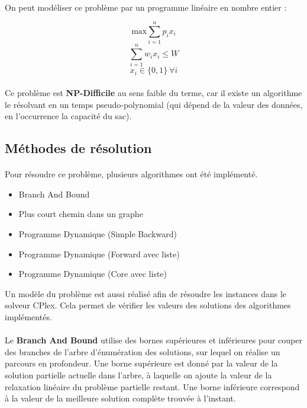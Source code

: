 \documentclass[12pt]{article}
\begin{document}
\paragraph{}On peut modéliser ce problème par un programme linéaire en nombre entier :

\[\textrm{max} \sum_{i=1}^{n} p_i x_i\]
\[\sum_{i=1}^{n} w_i x_i \leq W\]
\[x_i \in \lbrace0,1\rbrace\ \forall{i}\]

\paragraph{}Ce problème est \textbf{NP-Difficile} au sens faible du terme, car il existe un algorithme le résolvant en un temps pseudo-polynomial (qui dépend de la valeur des données, en l'occurrence la capacité du sac). 

\subsection{Méthodes de résolution}

\paragraph{}Pour résoudre ce problème, plusieurs algorithmes ont été implémenté.
\begin{itemize}
	\item Branch And Bound
	\item Plus court chemin dans un graphe
	\item Programme Dynamique (Simple Backward)
	\item Programme Dynamique (Forward avec liste)
	\item Programme Dynamique (Core avec liste)
\end{itemize}
Un modèle du problème est aussi réalisé afin de résoudre les instances dans le solveur CPlex. Cela permet de vérifier les valeurs des solutions des algorithmes implémentés.

\paragraph{}Le \textbf{Branch And Bound} utilise des bornes supérieures et inférieures pour couper des branches de l'arbre d'énumération des solutions, sur lequel on réalise un parcours en profondeur. Une borne supérieure est donné par la valeur de la solution partielle actuelle dans l'arbre, à laquelle on ajoute la valeur de la relaxation linéaire du problème partielle restant. Une borne inférieure correspond à la valeur de la meilleure solution complète trouvée à l'instant.
\end{document}
